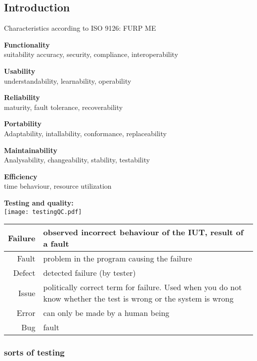 \subsection{Introduction}
Characteristics according to ISO 9126: FURP ME
\begin{itemize*}
\item \textbf{Functionality}\\
 suitability accuracy, security, compliance, interoperability
\item \textbf{Usability}\\
 understandability, learnability, operability
\item \textbf{Reliability}\\
 maturity, fault tolerance, recoverability
\item \textbf{Portability}\\
 Adaptability, intallability, conformance, replaceability
\item \textbf{Maintainability}\\
 Analysability, changeability, stability, testability
\item \textbf{Efficiency}\\
 time behaviour, resource utilization
\end{itemize*}

\textbf{Testing and quality:}\\
\texttt{[image: testingQC.pdf]}

\begin{tabularx}{\linewidth}{r|X}
	Failure  & observed incorrect behaviour of the IUT, result of a fault \\ 
	\hline Fault  & problem in the program causing the failure \\ 
    \hline Defect & detected failure (by tester)\\ 
	\hline Issue & politically correct term for failure. Used when you do not know whether the test is wrong or the system is wrong \\ 
	\hline Error & can only be made by a human being  \\ 
	\hline Bug & fault \\ 	
\end{tabularx} 

\subsubsection{sorts of testing}


